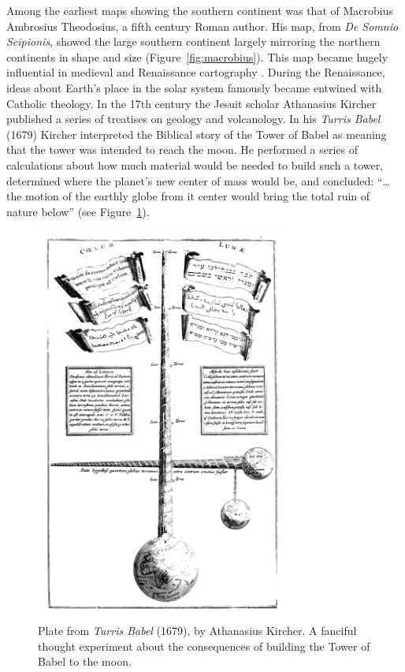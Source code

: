 Among the earliest maps showing the southern continent was that of Macrobius Ambrosius Theodosius, a fifth
century Roman author. His map, from \emph{De Somnio Scipionis}, showed the large southern continent
largely mirroring the northern continents in shape and size (Figure~\ref{fig:macrobius}).
This map became hugely influential in medieval and Renaissance cartography \citep{stahl1942astronomy}.
During the Renaissance, ideas about Earth's place in the solar system famously became
entwined with Catholic theology. In the 17th century the Jesuit scholar Athanasius Kircher
published a series of treatises on geology and volcanology. In his \emph{Turris Babel} (1679)
Kircher interpreted the Biblical story of the Tower of Babel as meaning that 
the tower was intended to reach the moon. He performed a series of calculations
about how much material would be needed to build such a tower, determined where the planet's new
center of mass would be, and concluded:
``\ldots the motion of the earthly globe from it center would bring the total ruin of nature below'' (see Figure~\ref{fig:turris_babel}).

\begin{figure}
\centering
\includegraphics[width=0.75\textwidth]{intro/figures/turris_babel.jpg}
\caption[Plate from \emph{Turris Babel} (1679), by Athanasius Kircher.]{Plate from \emph{Turris Babel} (1679), by Athanasius Kircher.
A fanciful thought experiment about the consequences of building the Tower of Babel to the moon.}
\label{fig:turris_babel}
\end{figure}


